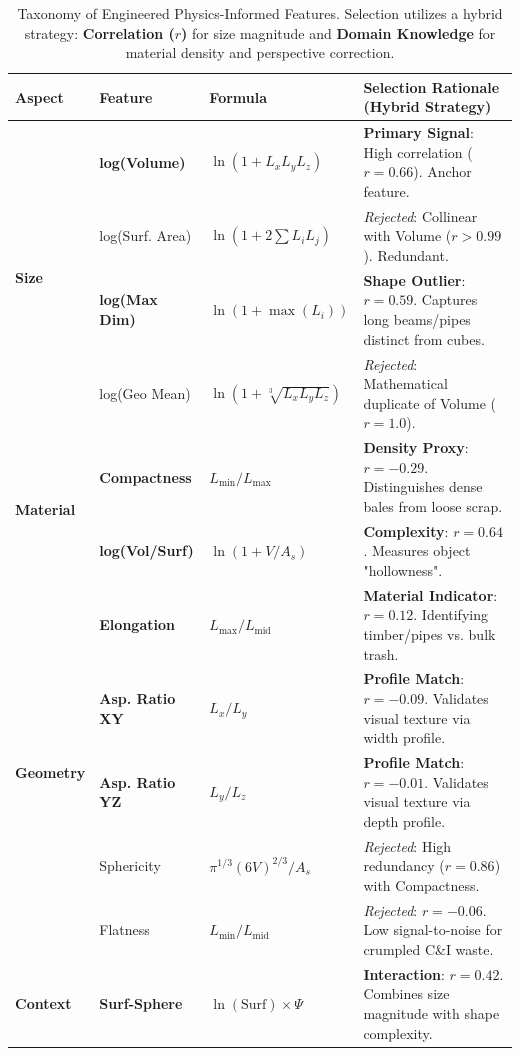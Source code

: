 \documentclass[journal,twoside,web]{ieeecolor}
\begin{document}
\begin{table}[!ht]
\centering
\small
\caption{Taxonomy of Engineered Physics-Informed Features. Selection utilizes a hybrid strategy: \textbf{Correlation ($r$)} for size magnitude and \textbf{Domain Knowledge} for material density and perspective correction.}
\label{tab:feature_engineering}
\scriptsize
\begin{tabular}{l l l l}

\midrule
\textbf{Aspect} & \textbf{Feature} & \textbf{Formula}  & \textbf{Selection Rationale (Hybrid Strategy)} \\
\midrule
\multirow{4}{*}{\textbf{Size}} & \textbf{log(Volume)} & $\ln(1 + L_x L_y L_z)$ & \textbf{Primary Signal}: High correlation ($r=0.66$). Anchor feature. \\
 & log(Surf. Area) & $\ln(1 + 2\sum L_i L_j)$ & \textit{Rejected}: Collinear with Volume ($r>0.99$). Redundant. \\
 & \textbf{log(Max Dim)} & $\ln(1 + \max(L_i))$ & \textbf{Shape Outlier}: $r=0.59$. Captures long beams/pipes distinct from cubes. \\
 & log(Geo Mean) & $\ln(1 + \sqrt[3]{L_x L_y L_z})$ & \textit{Rejected}: Mathematical duplicate of Volume ($r=1.0$). \\
\midrule
\multirow{2}{*}{\textbf{Material}} & \textbf{Compactness} & $L_{\min} / L_{\max}$ & \textbf{Density Proxy}: $r=-0.29$. Distinguishes dense bales from loose scrap. \\
 & \textbf{log(Vol/Surf)} & $\ln(1 + V/A_s)$ & \textbf{Complexity}: $r=0.64$. Measures object "hollowness". \\
\midrule
\multirow{5}{*}{\textbf{Geometry}} & \textbf{Elongation} & $L_{\max} / L_{\text{mid}}$ & \textbf{Material Indicator}: $r=0.12$. Identifying timber/pipes vs. bulk trash. \\
 & \textbf{Asp. Ratio XY} & $L_x / L_y$ & \textbf{Profile Match}: $r=-0.09$. Validates visual texture via width profile. \\
 & \textbf{Asp. Ratio YZ} & $L_y / L_z$ & \textbf{Profile Match}: $r=-0.01$. Validates visual texture via depth profile. \\
 & Sphericity & $\pi^{1/3}(6V)^{2/3} / A_s$ & \textit{Rejected}: High redundancy ($r=0.86$) with Compactness. \\
 & Flatness & $L_{\min} / L_{\text{mid}}$ & \textit{Rejected}: $r=-0.06$. Low signal-to-noise for crumpled C\&I waste. \\
\midrule
\multirow{4}{*}{\textbf{Context}} & \textbf{Surf-Sphere} & $\ln(\text{Surf}) \times \Psi$ & \textbf{Interaction}: $r=0.42$. Combines size magnitude with shape complexity. \\

\end{tabular}
\end{table}
\end{document}
